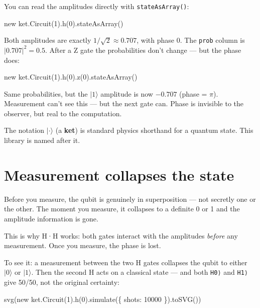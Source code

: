 \documentclass[
  11pt,
  letterpaper,
  oneside]{scrbook}
\newenvironment{Shaded}{\begin{snugshade}}{\end{snugshade}}
\newcommand{\NormalTok}[1]{\textcolor[rgb]{0.00,0.23,0.31}{#1}}
\begin{document}
You can read the amplitudes directly with \texttt{stateAsArray()}:

\begin{Shaded}
\begin{Highlighting}[]
\NormalTok{new ket.Circuit(1).h(0).stateAsArray()}
\end{Highlighting}
\end{Shaded}

Both amplitudes are exactly \(1/\sqrt{2} \approx 0.707\), with phase 0.
The \texttt{prob} column is \(|0.707|^2 = 0.5\). After a Z gate the
probabilities don't change --- but the phase does:

\begin{Shaded}
\begin{Highlighting}[]
\NormalTok{new ket.Circuit(1).h(0).z(0).stateAsArray()}
\end{Highlighting}
\end{Shaded}

Same probabilities, but the \(|1\rangle\) amplitude is now \(-0.707\)
(phase = \(\pi\)). Measurement can't see this --- but the next gate can.
Phase is invisible to the observer, but real to the computation.

The notation \(|\cdot\rangle\) (a \textbf{ket}) is standard physics
shorthand for a quantum state. This library is named after it.

\section{Measurement collapses the
state}\label{measurement-collapses-the-state}

Before you measure, the qubit is genuinely in superposition --- not
secretly one or the other. The moment you measure, it collapses to a
definite 0 or 1 and the amplitude information is gone.

This is why H·H works: both gates interact with the amplitudes
\emph{before} any measurement. Once you measure, the phase is lost.

To see it: a measurement between the two H gates collapses the qubit to
either \(|0\rangle\) or \(|1\rangle\). Then the second H acts on a
classical state --- and both \texttt{H\textbar{}0⟩} and
\texttt{H\textbar{}1⟩} give 50/50, not the original certainty:

\begin{Shaded}
\begin{Highlighting}[]
\NormalTok{svg(new ket.Circuit(1).h(0).simulate(\{ shots: 10000 \}).toSVG())}
\end{Highlighting}
\end{Shaded}
\end{document}
